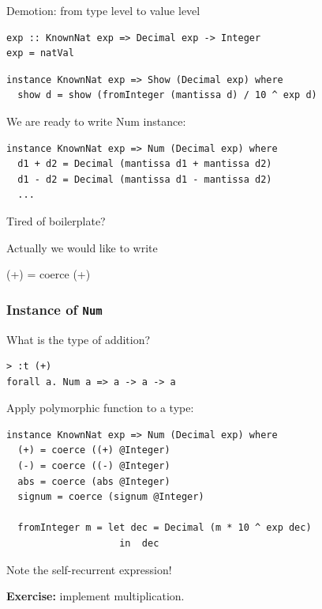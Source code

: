 \documentclass[handout]{beamer}
\begin{document}
\begin{frame}[fragile]{Demotion: from type level to value level}

\begin{lstlisting}
exp :: KnownNat exp => Decimal exp -> Integer
exp = natVal
\end{lstlisting}

\begin{lstlisting}
instance KnownNat exp => Show (Decimal exp) where
  show d = show (fromInteger (mantissa d) / 10 ^ exp d)
\end{lstlisting}

We are ready to write Num instance:

\begin{lstlisting}
instance KnownNat exp => Num (Decimal exp) where
  d1 + d2 = Decimal (mantissa d1 + mantissa d2)
  d1 - d2 = Decimal (mantissa d1 - mantissa d2)
  ...
\end{lstlisting}

\centerline{Tired of boilerplate?}

\bigskip

\centerline{Actually we would like to write}

\centerline{(+) = coerce (+)}

\end{frame}

\begin{frame}[fragile=singleslide]\frametitle{Instance of {\tt Num}}

What is the type of addition?

\begin{lstlisting}
> :t (+)
forall a. Num a => a -> a -> a
\end{lstlisting}

Apply polymorphic function to a type:

\begin{lstlisting}
instance KnownNat exp => Num (Decimal exp) where
  (+) = coerce ((+) @Integer)
  (-) = coerce ((-) @Integer)
  abs = coerce (abs @Integer)
  signum = coerce (signum @Integer)

  fromInteger m = let dec = Decimal (m * 10 ^ exp dec)
                    in  dec
\end{lstlisting}

\centerline{Note the self-recurrent expression!}

\bigskip

{\bf Exercise:} implement multiplication.

\end{frame}
\end{document}
